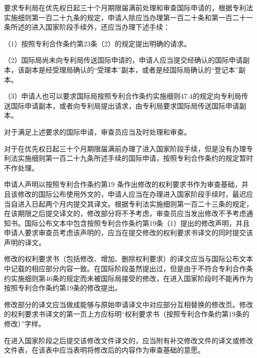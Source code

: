 要求专利局在优先权日起三十个月期限届满前处理和审查国际申请的，根据专利法实施细则第一百二十九条的规定，申请人除应当办理第一百二十条和第一百二十一条所述的进入国家阶段手续外，还应当办理下述手续：

{\setlength{\parindent}{17.8bp}（1）按照专利合作条约第23条（2）的规定提出明确的请求。\par}

{\setlength{\parindent}{17.8bp}（2）国际局尚未向专利局传送国际申请的，申请人应当提交经确认的国际申请副本，该副本是经受理局确认的“受理本”副本，或者是经国际局确认的“登记本”副本。\par}

{\setlength{\parindent}{17.8bp}（3）申请人也可以要求国际局按照专利合作条约实施细则47.4的规定向专利局传送国际申请副本，或者向专利局提出请求，由专利局要求国际局传送国际申请副本。\par}

对于满足上述要求的国际申请，审查员应当及时处理和审查。

对于在优先权日起三十个月期限届满前办理了进入国家阶段手续，但是没有办理专利法实施细则第一百二十九条所述手续的国际申请，按照专利合作条约的规定暂时不作处理。

申请人声明以按照专利合作条约第19 条作出修改的权利要求书作为审查基础，并且该修改的国际公布使用外文的，申请人应当在办理进入国家阶段手续时，最迟应当自进入日起两个月内提交其译文。根据专利法实施细则第一百二十三条的规定，在该期限之后提交译文的，修改部分将不予考虑，审查员应当发出修改不予考虑通知书。国际公布文本中包含按照专利合作条约第19条（1）提出的修改声明，并且申请人要求审查员考虑该声明的，应当在提交修改的权利要求书译文的同时提交该声明的译文。

修改的权利要求书（包括修改、增加、删除权利要求）的译文应当与国际公布文本中记载的相应部分内容一致。在国际阶段虽然提出过，但是由于不符合专利合作条约实施细则第46条的规定而未被国际局接受的修改，在进入国家阶段时不能再作为按照专利合作条约第19条的修改提出。

修改部分的译文应当做成能够与原始申请译文中对应部分互相替换的修改页。修改的权利要求书译文的第一页上方应标明“权利要求书（按照专利合作条约第19条的修改）”字样。

在进入国家阶段之后提交该修改文件译文的，应当附有补交修改文件的译文或修改文件表，在该表中应当表明将修改后的内容作为审查基础的意愿。

